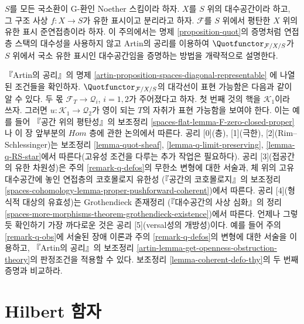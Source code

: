\begin{remark}
\label{remark-quot-via-artins-axioms}
$S$를 모든 국소환이 G-환인 Noether 스킴이라 하자. $X$를 $S$ 위의
대수공간이라 하고, 그 구조 사상 $f : X \to S$가 유한 표시이고
분리라고 하자. $\mathcal{F}$를 $S$ 위에서 평탄한 $X$ 위의 유한 표시
준연접층이라 하자. 이 주의에서는 명제 \ref{proposition-quot}의 증명처럼
연접층 스택의 대수성을 사용하지 않고 Artin의 공리를 이용하여
$\Quotfunctor_{\mathcal{F}/X/S}$가 $S$ 위에서 국소 유한 표시인
대수공간임을 증명하는 방법을 개략적으로 설명한다.

\medskip\noindent
『Artin의 공리』의 명제
\ref{artin-proposition-spaces-diagonal-representable}
에 나열된 조건들을 확인하자. $\Quotfunctor_{\mathcal{F}/X/S}$의 대각선이
표현 가능함은 다음과 같이 알 수 있다. 두 몫
$\mathcal{F}_T \to \mathcal{Q}_i$, $i = 1, 2$가 주어졌다고 하자.
첫 번째 것의 핵을 $\mathcal{K}_1$이라 쓰자. 그러면
$u : \mathcal{K}_1 \to \mathcal{Q}_2$가 영이 되는 $T$의 자취가
표현 가능함을 보여야 한다. 이는 예를 들어 『공간 위의 평탄성』의 보조정리
\ref{spaces-flat-lemma-F-zero-closed-proper}
나 이 장 앞부분의 $\mathit{Hom}$ 층에 관한 논의에서 따른다.
공리 [0](층), [1](극한), [2](Rim--Schlessinger)는 보조정리
\ref{lemma-quot-sheaf}, \ref{lemma-q-limit-preserving},
\ref{lemma-q-RS-star}에서 따른다(고유성 조건을 다루는 추가 작업은 필요하다).
공리 [3](접공간의 유한 차원성)은 주의 \ref{remark-q-defos}의 무한소 변형에
대한 서술과, 체 위의 고유 대수공간에 놓인 연접층의 코호몰로지 유한성
(『공간의 코호몰로지』의 보조정리
\ref{spaces-cohomology-lemma-proper-pushforward-coherent})에서 따른다.
공리 [4](형식적 대상의 유효성)는 Grothendieck 존재정리
(『대수공간의 사상 심화』의 정리
\ref{spaces-more-morphisms-theorem-grothendieck-existence})에서 따른다.
언제나 그렇듯 확인하기 가장 까다로운 것은 공리 [5](versal성의 개방성)이다.
예를 들어 주의 \ref{remark-q-obs}에 서술된 장애 이론과 주의
\ref{remark-q-defos}의 변형에 대한 서술을 이용하고, 『Artin의 공리』의
보조정리 \ref{artin-lemma-get-openness-obstruction-theory}의 판정조건을
적용할 수 있다. 보조정리 \ref{lemma-coherent-defo-thy}의 두 번째 증명과
비교하라.
\end{remark}









\section{Hilbert 함자}
\label{section-hilb}

